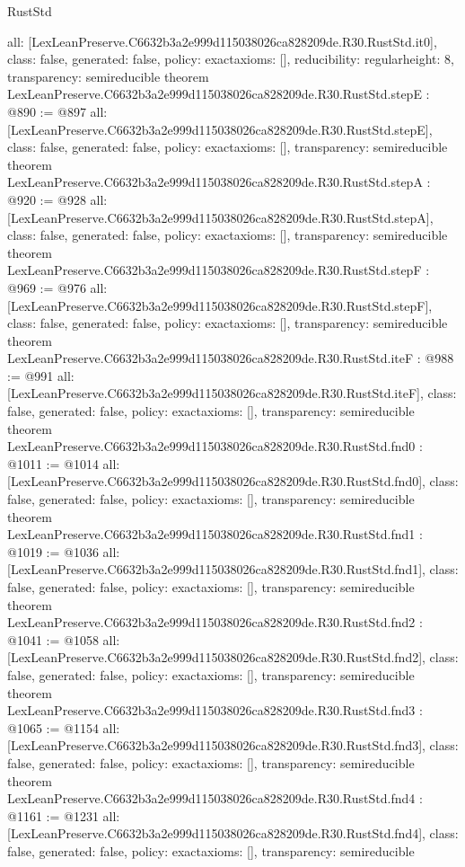 \begin{lexlean}{RustStd}
\begin{coremodule}
{  all: [LexLeanPreserve.C6632b3a2e999d115038026ca828209de.R30.RustStd.it0],
  class: false,
  generated: false,
  policy: exact{axioms: []},
  reducibility: regular{height: 8},
  transparency: semireducible
}
theorem LexLeanPreserve.C6632b3a2e999d115038026ca828209de.R30.RustStd.stepE : @890 := @897 {
  all: [LexLeanPreserve.C6632b3a2e999d115038026ca828209de.R30.RustStd.stepE],
  class: false,
  generated: false,
  policy: exact{axioms: []},
  transparency: semireducible
}
theorem LexLeanPreserve.C6632b3a2e999d115038026ca828209de.R30.RustStd.stepA : @920 := @928 {
  all: [LexLeanPreserve.C6632b3a2e999d115038026ca828209de.R30.RustStd.stepA],
  class: false,
  generated: false,
  policy: exact{axioms: []},
  transparency: semireducible
}
theorem LexLeanPreserve.C6632b3a2e999d115038026ca828209de.R30.RustStd.stepF : @969 := @976 {
  all: [LexLeanPreserve.C6632b3a2e999d115038026ca828209de.R30.RustStd.stepF],
  class: false,
  generated: false,
  policy: exact{axioms: []},
  transparency: semireducible
}
theorem LexLeanPreserve.C6632b3a2e999d115038026ca828209de.R30.RustStd.iteF : @988 := @991 {
  all: [LexLeanPreserve.C6632b3a2e999d115038026ca828209de.R30.RustStd.iteF],
  class: false,
  generated: false,
  policy: exact{axioms: []},
  transparency: semireducible
}
theorem LexLeanPreserve.C6632b3a2e999d115038026ca828209de.R30.RustStd.fnd0 : @1011 := @1014 {
  all: [LexLeanPreserve.C6632b3a2e999d115038026ca828209de.R30.RustStd.fnd0],
  class: false,
  generated: false,
  policy: exact{axioms: []},
  transparency: semireducible
}
theorem LexLeanPreserve.C6632b3a2e999d115038026ca828209de.R30.RustStd.fnd1 : @1019 := @1036 {
  all: [LexLeanPreserve.C6632b3a2e999d115038026ca828209de.R30.RustStd.fnd1],
  class: false,
  generated: false,
  policy: exact{axioms: []},
  transparency: semireducible
}
theorem LexLeanPreserve.C6632b3a2e999d115038026ca828209de.R30.RustStd.fnd2 : @1041 := @1058 {
  all: [LexLeanPreserve.C6632b3a2e999d115038026ca828209de.R30.RustStd.fnd2],
  class: false,
  generated: false,
  policy: exact{axioms: []},
  transparency: semireducible
}
theorem LexLeanPreserve.C6632b3a2e999d115038026ca828209de.R30.RustStd.fnd3 : @1065 := @1154 {
  all: [LexLeanPreserve.C6632b3a2e999d115038026ca828209de.R30.RustStd.fnd3],
  class: false,
  generated: false,
  policy: exact{axioms: []},
  transparency: semireducible
}
theorem LexLeanPreserve.C6632b3a2e999d115038026ca828209de.R30.RustStd.fnd4 : @1161 := @1231 {
  all: [LexLeanPreserve.C6632b3a2e999d115038026ca828209de.R30.RustStd.fnd4],
  class: false,
  generated: false,
  policy: exact{axioms: []},
  transparency: semireducible
}
\end{coremodule}
\end{lexlean}
